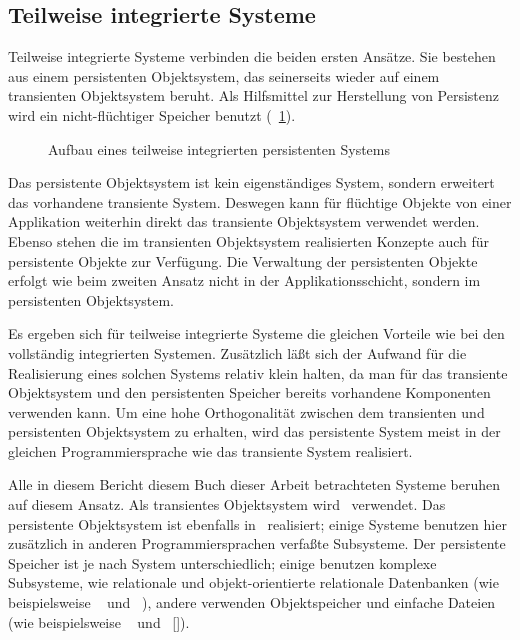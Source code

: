 \subsection{Teilweise integrierte Systeme}
%
Teilweise integrierte Systeme verbinden die beiden ersten Ans\"{a}tze.
Sie bestehen aus einem persistenten
Objektsystem, das seinerseits wieder auf einem transienten
Objektsystem beruht. Als Hilfsmittel zur Herstellung von Persistenz
wird ein nicht-fl\"{u}chtiger Speicher benutzt
(\figurename\ \ref{fig:rperlay}).
%
\begin{figure}[htbp]%
\ifbuch%
\centerline{}%
\else%
\centerline{}%
\fi%
\caption{Aufbau eines teilweise integrierten persistenten
Systems}\label{fig:rperlay}%
\end{figure}%
%
Das persistente Objektsystem ist kein eigenst\"{a}ndiges System, sondern
erweitert das vorhandene transiente System. Deswegen kann f\"{u}r
fl\"{u}chtige Objekte von einer Applikation weiterhin direkt das
transiente Objektsystem verwendet werden. Ebenso stehen die im
transienten Objektsystem realisierten Konzepte auch f\"{u}r persistente
Objekte zur Verf\"{u}gung. Die Verwaltung der
persistenten Objekte erfolgt wie beim zweiten Ansatz nicht in der
Applikationsschicht, sondern im persistenten Objektsystem.
%
\par{}Es ergeben sich f\"{u}r teilweise integrierte Systeme die gleichen
Vorteile wie bei den vollst\"{a}ndig integrierten Systemen. Zus\"{a}tzlich
l\"{a}\ss{}t sich der Aufwand f\"{u}r die Realisierung eines solchen Systems
relativ klein halten, da man f\"{u}r das transiente Objektsystem und den
persistenten Speicher bereits vorhandene Komponenten verwenden kann.
Um eine hohe Orthogonalit\"{a}t zwischen dem transienten und persistenten
Objektsystem zu erhalten, wird das persistente System meist in der
gleichen Programmiersprache wie das transiente System realisiert.
%
\par{}Alle in \ifbericht diesem Bericht \else\ifbuch diesem Buch
\else dieser Arbeit \fi\fi betrachteten Systeme beruhen auf diesem
Ansatz. Als transientes Objektsystem wird \clos\ verwendet. Das
persistente Objektsystem ist ebenfalls in \clos\ realisiert; einige
Systeme benutzen hier zus\"{a}tzlich in anderen Programmiersprachen
verfa\ss{}te Subsysteme. Der persistente Speicher ist je nach System
unterschiedlich; einige benutzen komplexe Subsysteme, wie relationale
und objekt-orientierte relationale Datenbanken (wie beispielsweise
\pclos\ \cite{bib:pa91a} und \soh\ \cite{bib:ro87}), andere verwenden
Objektspeicher und einfache Dateien (wie beispielsweise \wood\ 
\cite{bib:wo93} und \plob\ [\citepage{\pageref{chap:plob}}]).
%
